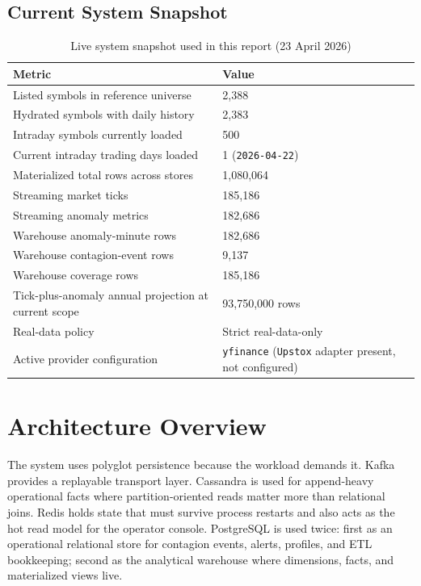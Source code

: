 \documentclass[11pt,a4paper]{article}
\begin{document}
\subsection{Current System Snapshot}
\begin{table}[H]
\centering
\caption{Live system snapshot used in this report (23 April 2026)}
\begin{tabularx}{\textwidth}{L{0.48\textwidth}Y}
\toprule
\textbf{Metric} & \textbf{Value} \\
\midrule
Listed symbols in reference universe & 2,388 \\
Hydrated symbols with daily history & 2,383 \\
Intraday symbols currently loaded & 500 \\
Current intraday trading days loaded & 1 (\texttt{2026-04-22}) \\
Materialized total rows across stores & 1,080,064 \\
Streaming market ticks & 185,186 \\
Streaming anomaly metrics & 182,686 \\
Warehouse anomaly-minute rows & 182,686 \\
Warehouse contagion-event rows & 9,137 \\
Warehouse coverage rows & 185,186 \\
Tick-plus-anomaly annual projection at current scope & 93,750,000 rows \\
Real-data policy & Strict real-data-only \\
Active provider configuration & \texttt{yfinance} (\texttt{Upstox} adapter present, not configured) \\
\bottomrule
\end{tabularx}
\end{table}

\section{Architecture Overview}
The system uses polyglot persistence because the workload demands it. Kafka provides a replayable transport layer. Cassandra is used for append-heavy operational facts where partition-oriented reads matter more than relational joins. Redis holds state that must survive process restarts and also acts as the hot read model for the operator console. PostgreSQL is used twice: first as an operational relational store for contagion events, alerts, profiles, and ETL bookkeeping; second as the analytical warehouse where dimensions, facts, and materialized views live.
\end{document}
